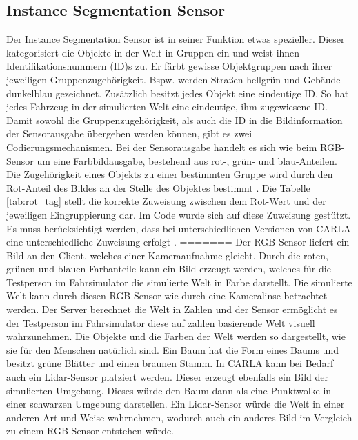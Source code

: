 \subsection{Instance Segmentation Sensor}
Der Instance Segmentation Sensor ist in seiner Funktion etwas spezieller. Dieser kategorisiert die Objekte in der Welt in Gruppen ein und weist ihnen Identifikationsnummern ({\acs{ID}})s zu. Er färbt gewisse Objektgruppen nach ihrer jeweiligen Gruppenzugehörigkeit. Bspw. werden Straßen hellgrün und Gebäude dunkelblau gezeichnet. Zusätzlich besitzt jedes Objekt eine eindeutige {\ac{ID}}. So hat jedes Fahrzeug in der simulierten Welt eine eindeutige, ihm zugewiesene {\ac{ID}}. Damit sowohl die Gruppenzugehörigkeit, als auch die {\ac{ID}} in die Bildinformation der Sensorausgabe übergeben werden können, gibt es zwei Codierungsmechanismen. Bei der Sensorausgabe handelt es sich wie beim {\ac{RGB}}-Sensor um eine Farbbildausgabe, bestehend aus rot-, grün- und blau-Anteilen. Die Zugehörigkeit eines Objekts zu einer bestimmten Gruppe wird durch den Rot-Anteil des Bildes an der Stelle des Objektes bestimmt \cite{lit_website_carla_documentation}. Die Tabelle \ref{tab:rot_tag} stellt die korrekte Zuweisung zwischen dem Rot-Wert und der jeweiligen Eingruppierung dar. Im Code wurde sich auf diese Zuweisung gestützt. Es muss berücksichtigt werden, dass bei unterschiedlichen Versionen von CARLA eine unterschiedliche Zuweisung erfolgt \cite{lit_website_carla_documentation}. 
=======
Der {\ac{RGB}}-Sensor liefert ein Bild an den Client, welches einer Kameraaufnahme gleicht. Durch die roten, grünen und blauen Farbanteile kann ein Bild erzeugt werden, welches für die Testperson im Fahrsimulator die simulierte Welt in Farbe darstellt. Die simulierte Welt kann durch diesen {\ac{RGB}}-Sensor wie durch eine Kameralinse betrachtet werden. Der Server berechnet die Welt in Zahlen und der Sensor ermöglicht es der Testperson im Fahrsimulator diese auf zahlen basierende Welt visuell wahrzunehmen. Die Objekte und die Farben der Welt werden so dargestellt, wie sie für den Menschen natürlich sind. Ein Baum hat die Form eines Baums und besitzt grüne Blätter und einen braunen Stamm. In CARLA kann bei Bedarf auch ein \Gls{Lidar}-Sensor platziert werden. Dieser erzeugt ebenfalls ein Bild der simulierten Umgebung. Dieses würde den Baum dann als eine Punktwolke in einer schwarzen Umgebung darstellen. Ein Lidar-Sensor würde die Welt in einer anderen Art und Weise wahrnehmen, wodurch auch ein anderes Bild im Vergleich zu einem {\ac{RGB}}-Sensor entstehen würde. 

